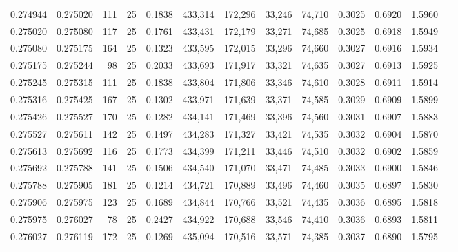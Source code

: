 \begin{tabular}{rrrrrrrrrrrrr}
0.274944 & 0.275020 &   111 &  25 &                                     0.1838 & 433,314 & 172,296 &  33,246 &  74,710 & 0.3025 & 0.6920 & 1.5960 \\
0.275020 & 0.275080 &   117 &  25 &                                     0.1761 & 433,431 & 172,179 &  33,271 &  74,685 & 0.3025 & 0.6918 & 1.5949 \\
0.275080 & 0.275175 &   164 &  25 &                                     0.1323 & 433,595 & 172,015 &  33,296 &  74,660 & 0.3027 & 0.6916 & 1.5934 \\
0.275175 & 0.275244 &    98 &  25 &                                     0.2033 & 433,693 & 171,917 &  33,321 &  74,635 & 0.3027 & 0.6913 & 1.5925 \\
0.275245 & 0.275315 &   111 &  25 &                                     0.1838 & 433,804 & 171,806 &  33,346 &  74,610 & 0.3028 & 0.6911 & 1.5914 \\
0.275316 & 0.275425 &   167 &  25 &                                     0.1302 & 433,971 & 171,639 &  33,371 &  74,585 & 0.3029 & 0.6909 & 1.5899 \\
0.275426 & 0.275527 &   170 &  25 &                                     0.1282 & 434,141 & 171,469 &  33,396 &  74,560 & 0.3031 & 0.6907 & 1.5883 \\
0.275527 & 0.275611 &   142 &  25 &                                     0.1497 & 434,283 & 171,327 &  33,421 &  74,535 & 0.3032 & 0.6904 & 1.5870 \\
0.275613 & 0.275692 &   116 &  25 &                                     0.1773 & 434,399 & 171,211 &  33,446 &  74,510 & 0.3032 & 0.6902 & 1.5859 \\
0.275692 & 0.275788 &   141 &  25 &                                     0.1506 & 434,540 & 171,070 &  33,471 &  74,485 & 0.3033 & 0.6900 & 1.5846 \\
0.275788 & 0.275905 &   181 &  25 &                                     0.1214 & 434,721 & 170,889 &  33,496 &  74,460 & 0.3035 & 0.6897 & 1.5830 \\
0.275906 & 0.275975 &   123 &  25 &                                     0.1689 & 434,844 & 170,766 &  33,521 &  74,435 & 0.3036 & 0.6895 & 1.5818 \\
0.275975 & 0.276027 &    78 &  25 &                                     0.2427 & 434,922 & 170,688 &  33,546 &  74,410 & 0.3036 & 0.6893 & 1.5811 \\
0.276027 & 0.276119 &   172 &  25 &                                     0.1269 & 435,094 & 170,516 &  33,571 &  74,385 & 0.3037 & 0.6890 & 1.5795 \\

\end{tabular}

